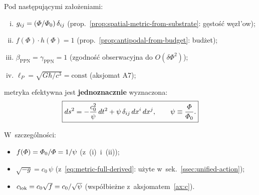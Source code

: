 \iffalse
\begin{theorem}%
\label{thm:metric-from-substrate-full-DEPRECATED}
Pod nast\k{e}puj\k{a}cymi za\l{}o\.zeniami:
\begin{enumerate}[(i),nosep]
  \item $g_{ij} = (\varPhi/\varPhi_0)\,\delta_{ij}$
        \hfill(prop.~\ref{prop:spatial-metric-from-substrate}: g\k{e}sto\'s\'c
        w\k{e}z\l{}'ow);
  \item $f(\Phi)\cdot h(\Phi) = 1$
        \hfill(prop.~\ref{prop:antipodal-from-budget}: bud\.zet);
  \item $\beta_{\mathrm{PPN}} = \gamma_{\mathrm{PPN}} = 1$
        \hfill(zgodno\'s\'c obserwacyjna do $O(\delta\Phi^2)$);
  \item $\ell_P = \sqrt{G\hbar/c^3} = \text{const}$
        \hfill(aksjomat A7);
\end{enumerate}
metryka efektywna jest \textbf{jednoznacznie} wyznaczona:
\begin{equation}\label{eq:metric-full-derived}
  \boxed{
    ds^2 = -\frac{c_0^2}{\psi}\,dt^2
         + \psi\,\delta_{ij}\,dx^i\,dx^j,
    \qquad \psi \equiv \frac{\varPhi}{\varPhi_0}.
  }
\end{equation}
%

W~szczeg\'olno\'sci:
\begin{itemize}[nosep]
  \item $f(\varPhi) = \varPhi_0/\varPhi = 1/\psi$ \quad(z~(i)~i~(ii));
  \item $\sqrt{-g} = c_0\,\psi$
        \quad(z~\eqref{eq:metric-full-derived}: u\.zyte w~sek.~\ref{ssec:unified-action});
  \item $c_{\rm lok} = c_0\sqrt{f} = c_0/\sqrt{\psi}$
        \quad(wsp\'o\l{}bieżne z~aksjomatem~\ref{ax:c}).
\end{itemize}
\end{theorem}

